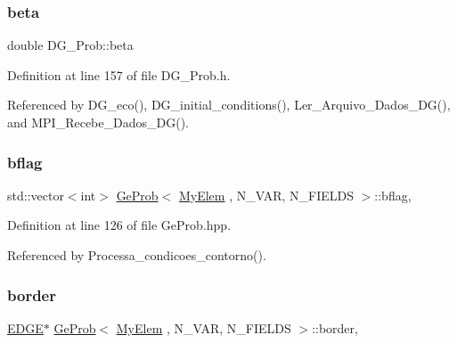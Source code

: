 \mbox{\label{classDG__Prob_a6ab4e3c1a81f2c882fab1fb689f5732a}} 
\subsubsection{\texorpdfstring{beta}{beta}}
{\footnotesize\ttfamily double D\+G\+\_\+\+Prob\+::beta\hspace{0.3cm}{\ttfamily [private]}}



Definition at line 157 of file D\+G\+\_\+\+Prob.\+h.



Referenced by D\+G\+\_\+eco(), D\+G\+\_\+initial\+\_\+conditions(), Ler\+\_\+\+Arquivo\+\_\+\+Dados\+\_\+\+D\+G(), and M\+P\+I\+\_\+\+Recebe\+\_\+\+Dados\+\_\+\+D\+G().

\mbox{\label{classGeProb_a60d3ba92d41a0776cdb3869e9bfeff7e}} 
\subsubsection{\texorpdfstring{bflag}{bflag}}
{\footnotesize\ttfamily std\+::vector$<$int$>$ \hyperlink{classGeProb}{Ge\+Prob}$<$ \hyperlink{DG__Prob_8h_a83cd887ced9a6587428f267e50cd4787}{My\+Elem} , N\+\_\+\+V\+AR, N\+\_\+\+F\+I\+E\+L\+DS $>$\+::bflag\hspace{0.3cm}{\ttfamily [protected]}, {\ttfamily [inherited]}}



Definition at line 126 of file Ge\+Prob.\+hpp.



Referenced by Processa\+\_\+condicoes\+\_\+contorno().

\mbox{\label{classGeProb_a6c144ac05b601c5d6141c711edaaa775}} 
\subsubsection{\texorpdfstring{border}{border}}
{\footnotesize\ttfamily \hyperlink{structEDGE}{E\+D\+GE}$\ast$ \hyperlink{classGeProb}{Ge\+Prob}$<$ \hyperlink{DG__Prob_8h_a83cd887ced9a6587428f267e50cd4787}{My\+Elem} , N\+\_\+\+V\+AR, N\+\_\+\+F\+I\+E\+L\+DS $>$\+::border\hspace{0.3cm}{\ttfamily [protected]}, {\ttfamily [inherited]}}



